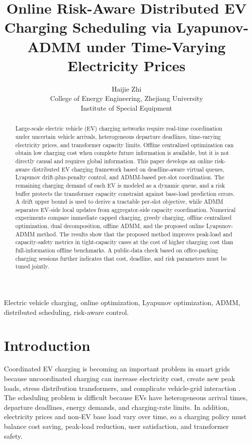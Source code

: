 \documentclass[journal]{IEEEtran}
\title{Online Risk-Aware Distributed EV Charging Scheduling via Lyapunov-ADMM under Time-Varying Electricity Prices}
\author{Haijie Zhi\\
College of Energy Engineering, Zhejiang University\\
Institute of Special Equipment}
\begin{document}
\maketitle

\begin{abstract}
Large-scale electric vehicle (EV) charging networks require real-time coordination under uncertain vehicle arrivals, heterogeneous departure deadlines, time-varying electricity prices, and transformer capacity limits. Offline centralized optimization can obtain low charging cost when complete future information is available, but it is not directly causal and requires global information. This paper develops an online risk-aware distributed EV charging framework based on deadline-aware virtual queues, Lyapunov drift-plus-penalty control, and ADMM-based per-slot coordination. The remaining charging demand of each EV is modeled as a dynamic queue, and a risk buffer protects the transformer capacity constraint against base-load prediction errors. A drift upper bound is used to derive a tractable per-slot objective, while ADMM separates EV-side local updates from aggregator-side capacity coordination. Numerical experiments compare immediate capped charging, greedy charging, offline centralized optimization, dual decomposition, offline ADMM, and the proposed online Lyapunov-ADMM method. The results show that the proposed method improves peak-load and capacity-safety metrics in tight-capacity cases at the cost of higher charging cost than full-information offline benchmarks. A public-data check based on office-parking charging sessions further indicates that cost, deadline, and risk parameters must be tuned jointly.
\end{abstract}

\begin{IEEEkeywords}
Electric vehicle charging, online optimization, Lyapunov optimization, ADMM, distributed scheduling, risk-aware control.
\end{IEEEkeywords}

\section{Introduction}
Coordinated EV charging is becoming an important problem in smart grids because uncoordinated charging can increase electricity cost, create new peak loads, stress distribution transformers, and complicate vehicle-grid interaction \cite{Clement2010,Deilami2011,Guille2009,Richardson2013,Yilmaz2012}. The scheduling problem is difficult because EVs have heterogeneous arrival times, departure deadlines, energy demands, and charging-rate limits. In addition, electricity prices and non-EV base load vary over time, so a charging policy must balance cost saving, peak-load reduction, user satisfaction, and transformer safety.
\end{document}
